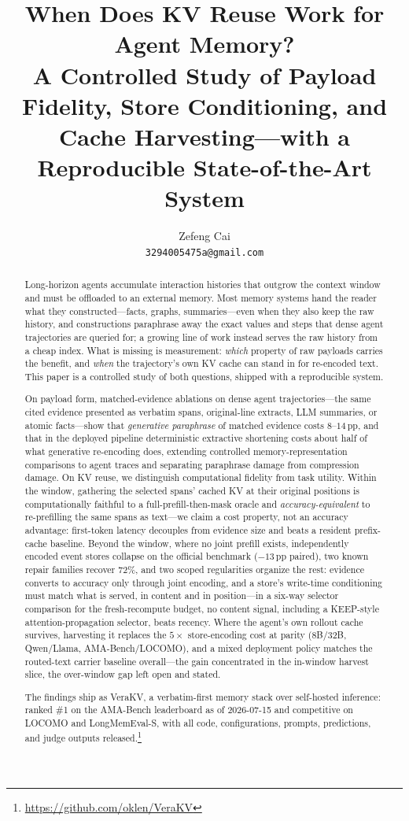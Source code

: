 \documentclass{article} %
\title{When Does KV Reuse Work for Agent Memory?\\
\large A Controlled Study of Payload Fidelity, Store Conditioning, and Cache
Harvesting---with a Reproducible State-of-the-Art System}
\author{Zefeng Cai\\
\texttt{3294005475a@gmail.com}}
\newcommand{\pp}{\,\mathrm{pp}}
\newcommand{\kvm}{VeraKV}
\begin{document}
\maketitle
{}

\begin{abstract}
Long-horizon agents accumulate interaction histories that outgrow the context window
and must be offloaded to an external memory. Most memory systems hand the reader what they constructed---facts, graphs,
summaries---even when they also keep the raw history, and constructions paraphrase away the exact values and steps that dense agent trajectories
are queried for; a growing line of work instead serves the raw history from a
cheap index. What is missing is measurement: \emph{which} property of raw payloads
carries the benefit, and \emph{when} the trajectory's own KV cache can stand in for
re-encoded text. This paper is a controlled study of both questions, shipped with a
reproducible system.

On payload form, matched-evidence ablations on dense agent trajectories---the same
cited evidence presented as verbatim spans, original-line extracts, LLM summaries, or
atomic facts---show that \emph{generative paraphrase} of matched evidence costs
$8$--$14\pp$, and that in the deployed pipeline deterministic extractive shortening costs about half of what generative re-encoding does,
extending controlled memory-representation comparisons to agent traces and separating
paraphrase damage from compression damage. On KV reuse, we distinguish computational
fidelity from task utility. Within the window, gathering the selected spans'
cached KV at their original positions is computationally faithful to a
full-prefill-then-mask oracle and \emph{accuracy-equivalent} to re-prefilling the
same spans as text---we claim a cost property, not an accuracy advantage: first-token
latency decouples from evidence size and beats a resident prefix-cache baseline.
Beyond the window, where no joint prefill exists, independently encoded event stores
collapse on the official benchmark ($-13\pp$ paired), two known repair families
recover $72\%$, and two scoped regularities organize the rest: evidence converts to
accuracy only through joint encoding, and a store's write-time conditioning must
match what is served, in content and in position---in a six-way selector comparison for the
fresh-recompute budget, no content signal, including a KEEP-style attention-propagation selector,
beats recency. Where the agent's own rollout cache survives, harvesting it
replaces the $5\times$ store-encoding cost at parity (8B/32B, Qwen/Llama,
AMA-Bench/LOCOMO), and a mixed deployment policy matches the routed-text carrier
baseline overall---the gain concentrated in the in-window harvest slice, the
over-window gap left open and stated.

The findings ship as \kvm{}, a verbatim-first memory stack over self-hosted
inference: ranked \#1 on the AMA-Bench leaderboard as of 2026-07-15 and competitive
on LOCOMO and LongMemEval-S, with all code, configurations, prompts, predictions,
and judge outputs released.\footnote{\url{https://github.com/oklen/VeraKV}}
\end{abstract}
\end{document}
